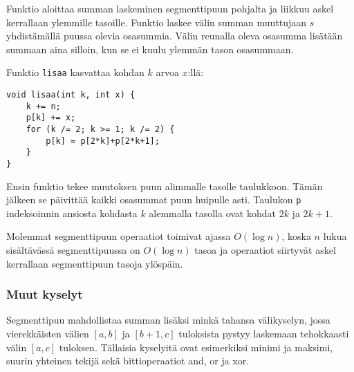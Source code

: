 Funktio aloittaa summan laskeminen segmenttipuun
pohjalta ja liikkuu askel kerrallaan ylemmille tasoille.
Funktio laskee välin summan muuttujaan $s$
yhdistämällä puussa olevia osasummia.
Välin reunalla oleva osasumma lisätään summaan
aina silloin, kun se ei kuulu ylemmän tason osasummaan.

Funktio \texttt{lisaa} kasvattaa kohdan $k$ arvoa $x$:llä:

\begin{lstlisting}
void lisaa(int k, int x) {
    k += n;
    p[k] += x;
    for (k /= 2; k >= 1; k /= 2) {
        p[k] = p[2*k]+p[2*k+1];
    }
}
\end{lstlisting}
Ensin funktio tekee muutoksen puun alimmalle
tasolle taulukkoon.
Tämän jälkeen se päivittää kaikki osasummat
puun huipulle asti.
Taulukon \texttt{p} indeksoinnin ansiosta
kohdasta $k$ alemmalla tasolla
ovat kohdat $2k$ ja $2k+1$.

Molemmat segmenttipuun operaatiot toimivat ajassa
$O(\log n)$, koska $n$ lukua sisältävässä
segmenttipuussa on $O(\log n)$ tasoa
ja operaatiot siirtyvät askel kerrallaan
segmenttipuun tasoja ylöspäin.

\subsubsection{Muut kyselyt}

Segmenttipuu mahdollistaa summan lisäksi minkä
tahansa välikyselyn,
jossa vierekkäisten välien $[a,b]$ ja $[b+1,c]$
tuloksista pystyy laskemaan tehokkaasti
välin $[a,c]$ tuloksen.
Tällaisia kyselyitä
ovat esimerkiksi minimi ja maksimi,
suurin yhteinen tekijä
sekä bittioperaatiot and, or ja xor.

